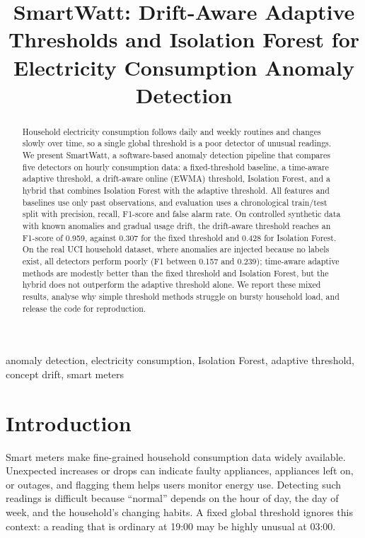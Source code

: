 \documentclass[conference]{IEEEtran}
\begin{document}
\title{SmartWatt: Drift-Aware Adaptive Thresholds and Isolation Forest for Electricity Consumption Anomaly Detection}

\author{
}

\maketitle

\begin{abstract}
Household electricity consumption follows daily and weekly routines and changes slowly over time, so a single global threshold is a poor detector of unusual readings. We present SmartWatt, a software-based anomaly detection pipeline that compares five detectors on hourly consumption data: a fixed-threshold baseline, a time-aware adaptive threshold, a drift-aware online (EWMA) threshold, Isolation Forest, and a hybrid that combines Isolation Forest with the adaptive threshold. All features and baselines use only past observations, and evaluation uses a chronological train/test split with precision, recall, F1-score and false alarm rate. On controlled synthetic data with known anomalies and gradual usage drift, the drift-aware threshold reaches an F1-score of 0.959, against 0.307 for the fixed threshold and 0.428 for Isolation Forest. On the real UCI household dataset, where anomalies are injected because no labels exist, all detectors perform poorly (F1 between 0.157 and 0.239); time-aware adaptive methods are modestly better than the fixed threshold and Isolation Forest, but the hybrid does not outperform the adaptive threshold alone. We report these mixed results, analyse why simple threshold methods struggle on bursty household load, and release the code for reproduction.
\end{abstract}

\begin{IEEEkeywords}
anomaly detection, electricity consumption, Isolation Forest, adaptive threshold, concept drift, smart meters
\end{IEEEkeywords}

\section{Introduction}
Smart meters make fine-grained household consumption data widely available. Unexpected increases or drops can indicate faulty appliances, appliances left on, or outages, and flagging them helps users monitor energy use. Detecting such readings is difficult because ``normal'' depends on the hour of day, the day of week, and the household's changing habits. A fixed global threshold ignores this context: a reading that is ordinary at 19:00 may be highly unusual at 03:00.
\end{document}
